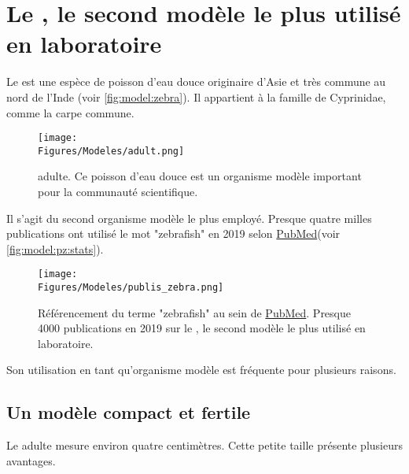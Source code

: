 \documentclass[\main/main.tex]{subfiles}
\begin{document}
            
\section{Le \pz{}, le second modèle le plus utilisé en laboratoire}

%
Le \pz{} est une espèce de poisson d'eau douce originaire d'Asie et très commune au nord de l'Inde (voir \autoref{fig:model:zebra}).
%
Il appartient à la famille de Cyprinidae, comme la carpe commune.

\begin{figure}[h!]{\textwidth} 
    \centering
       \centering \texttt{[image: \\Figures/Modeles/adult.png]}
       \caption{
            \label{fig:model:zebra}\pz{} adulte. \newline
            Ce poisson d'eau douce est un organisme modèle important pour la communauté scientifique.
            }
\end{figure}

%
Il s'agit du second organisme modèle le plus employé.
%
Presque quatre milles publications ont utilisé le mot "zebrafish" en 2019
selon \href{https://pubmed.ncbi.nlm.nih.gov/?term=zebrafish&sort=pubdate}{PubMed}(voir \autoref{fig:model:pz:stats}).

\begin{figure}[h!]{\textwidth} 
    \centering
       \centering \texttt{[image: \\Figures/Modeles/publis\_zebra.png]}
       \caption{
            \label{fig:model:pz:stats}Référencement du terme "zebrafish" au sein de \href{https://pubmed.ncbi.nlm.nih.gov/?term=zebrafish&sort=pubdate}{PubMed}.
            \newline
            Presque 4000 publications en 2019 sur le \pz{}, le second modèle le plus utilisé en laboratoire.
            }
\end{figure}
%
Son utilisation en tant qu'organisme modèle est fréquente pour plusieurs raisons.

    \subsection{Un modèle compact et fertile}
    
%
Le \pz{} adulte mesure environ quatre centimètres.
%
Cette petite taille présente plusieurs avantages.
\end{document}

